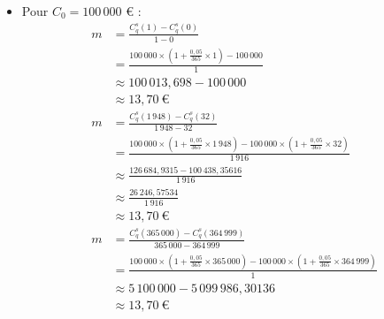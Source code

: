 \documentclass{article}
\begin{document}
\begin{enumerate}[label=\textbf{Q\arabic*.}]
\begin{itemize}
        \item Pour \( C_0 = 100\,000 \) € :
        \[
            \begin{aligned}
            m &= \frac{C^s_q(1) - C^s_q(0)}{1 - 0} \\
              &= \frac{100\,000 \times \left(1 + \frac{0{,}05}{365} \times 1\right) - 100\,000}{1} \\
              &\approx 100\,013{,}698 - 100\,000 \\
              &\approx 13{,}70\ \text{€} \\[1em]
            m &= \frac{C^s_q(1\,948) - C^s_q(32)}{1\,948 - 32} \\
              &= \frac{100\,000 \times \left(1 + \frac{0{,}05}{365} \times 1\,948\right) - 100\,000 \times \left(1 + \frac{0{,}05}{365} \times 32\right)}{1\,916} \\
              &\approx \frac{126\,684{,}9315 - 100\,438{,}35616}{1\,916} \\
              &\approx \frac{26\,246{,}57534}{1\,916} \\
              &\approx 13{,}70\ \text{€} \\[1em]
            m &= \frac{C^s_q(365\,000) - C^s_q(364\,999)}{365\,000 - 364\,999} \\
              &= \frac{100\,000 \times \left(1 + \frac{0{,}05}{365} \times 365\,000\right) - 100\,000 \times \left(1 + \frac{0{,}05}{365} \times 364\,999\right)}{1} \\
              &\approx 5\,100\,000 - 5\,099\,986,30136 \\
              &\approx 13{,}70\ \text{€}
            \end{aligned}
        \]
    

\end{itemize}
\end{enumerate}
\end{document}
